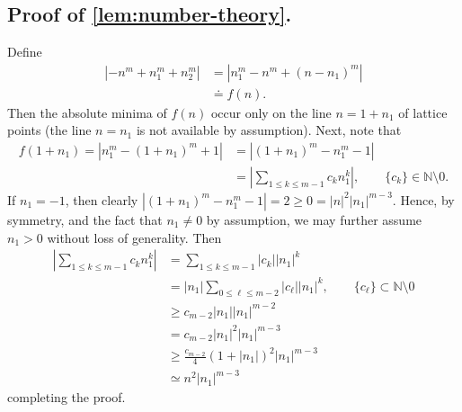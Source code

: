 \documentclass[12pt,reqno]{amsart}
\numberwithin{equation}{section}  %
\numberwithin{figure}{section}
\theoremstyle{plain}
\theoremstyle{definition}
\theoremstyle{remark}
\begin{document}
\newpage
%
%
%
%
\appendix
\section{}
%
%
\subsection{Proof of \autoref{lem:number-theory}.} Define
%
\begin{equation*}
	\begin{split}
		| - n^{m} + n_1^{m} + n_2^{m }|
		& = | n_{1}^{m} - n^{m} + (n-n_{1})^{m}| 
		\\
		& \doteq f(n).
	\end{split}
\end{equation*}
%
%
Then the absolute minima
of $f(n)$ occur only on the line $n = 1+n_{1}$ of lattice points 
(the line $n = n_1$ is not available by assumption). Next, note that
%
%
\begin{equation*}
	\begin{split}
		f(1+ n_{1}) = | n_{1}^{m} - (1 + n_{1})^m + 1 |
		& = | (1 + n_{1} )^{m} - n_{1}^{m} -1 |
		\\
		& = | \sum_{1 \le k \le m-1} c_{k} n_1^{k}|, \qquad \{c_k\} \in \mathbb{N}
		\setminus 0.
	\end{split}
\end{equation*}
If $n_1 = -1$, then clearly $| (1 + n_{1})^m - n_1^m -1 | = 2 \ge 0 = |n|^2
|n_1|^{m-3}$. Hence, by symmetry, and the fact that $n_1 \neq 0$ by assumption,
we may further assume
$n_1 >0$ without loss of generality.
Then 
%
%
\begin{equation*}
	\begin{split}
	  | \sum_{1 \le k \le m-1} c_{k} n_1^{k}|
	 & = \sum_{1 \le k \le m-1} |c_{k}| |n_1|^{k}
	 \\
	 & = |n_1| \sum_{0 \le \ell \le m-2} |c_{\ell}| |n_1|^{k}, \qquad \{c_\ell\}
	 \subset \mathbb{N} \setminus 0
	 \\
	 & \ge c_{m-2}|n_1| | n_1|^{m-2}
	 \\
	 & = c_{m-2}| n_1 |^2 | n_1 |^{m-3}
	 \\
	 & \ge \frac{c_{m-2}}{4} (1 + | n_1 |)^2 | n_1|^{m-3}
	 \\
	 & \simeq n^2 | n_1 |^{m-3}
	\end{split}
\end{equation*}
%
%
completing the proof. \qquad \qedsymbol
%
%
%
\end{document}
